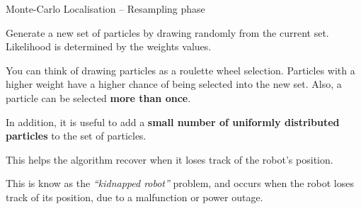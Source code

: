 \documentclass[compress,xcolor=table]{beamer}
\begin{document}
\begin{frame}{Monte-Carlo Localisation -- Resampling phase}

    Generate a new set of particles by drawing randomly from the current
    set. Likelihood is determined by the weights values.


    \begin{overprint}
        \vspace{1em}
        \small
        You can think of drawing particles as a roulette wheel selection.
        Particles with a higher weight have a higher chance of being
        selected into the new set. Also, a particle can be selected \textbf{more than
        once}.

        \centering

        \vspace{2em}
        In addition, it is useful to add a \textbf{small number of uniformly distributed
        particles} to the set of particles.

        This helps the algorithm recover when it loses track of the robot's
        position.

        \vspace{1em}
        \small
        This is know as the \emph{``kidnapped robot''} problem, and occurs when the
        robot loses track of its position, due to a malfunction or power
        outage.


    \end{overprint}

\end{frame}
\end{document}
